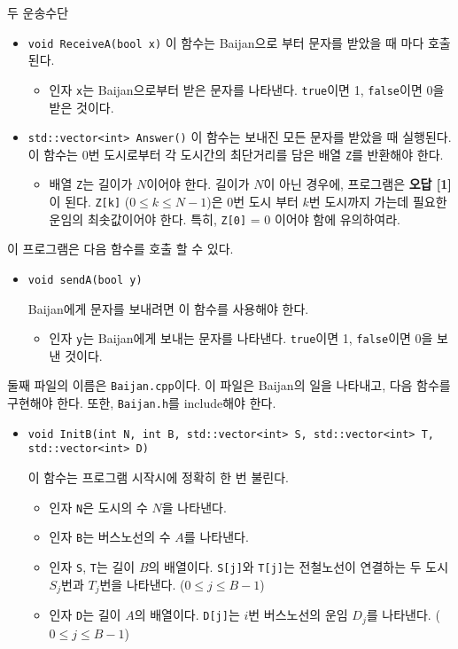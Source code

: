 \begin{problem}{두 운송수단}
\begin{itemize}
		\item \texttt{void ReceiveA(bool x)}
		이 함수는 Baijan으로 부터 문자를 받았을 때 마다 호출 된다.
		\begin{itemize}
			\item 인자 \texttt{x}는 Baijan으로부터 받은 문자를 나타낸다. \texttt{true}이면 1, \texttt{false}이면 0을 받은 것이다.
		\end{itemize}
		
		\item \texttt{std::vector<int> Answer()}
		이 함수는 보내진 모든 문자를 받았을 때 실행된다. 이 함수는 0번 도시로부터 각 도시간의 최단거리를 담은 배열 \texttt{Z}를 반환해야 한다.
		\begin{itemize}
			\item 배열 \texttt{Z}는 길이가 $N$이어야 한다. 길이가 $N$이 아닌 경우에, 프로그램은 \textbf{오답 [1]}이 된다.
			\texttt{Z[k]} ($0 \le k \le N-1$)은 0번 도시 부터 $k$번 도시까지 가는데 필요한 운임의 최솟값이어야 한다. 특히, \texttt{Z[0]} = 0 이어야 함에 유의하여라.
		\end{itemize}
	\end{itemize}

	이 프로그램은 다음 함수를 호출 할 수 있다.

	\begin{itemize}
		\item \texttt{void sendA(bool y)}
		
		Baijan에게 문자를 보내려면 이 함수를 사용해야 한다.
		
		\begin{itemize}
			\item 인자 \texttt{y}는 Baijan에게 보내는 문자를 나타낸다. \texttt{true}이면 1, \texttt{false}이면 0을 보낸 것이다.
		\end{itemize}
		
	\end{itemize}
		
	둘째 파일의 이름은 \texttt{Baijan.cpp}이다. 이 파일은 Baijan의 일을 나타내고, 다음 함수를 구현해야 한다. 또한, \texttt{Baijan.h}를 include해야 한다.

	\begin{itemize}
		\item \texttt{void InitB(int N, int B, std::vector<int> S, std::vector<int> T, std::vector<int> D)}
		
		이 함수는 프로그램 시작시에 정확히 한 번 불린다.
		\begin{itemize}
			\item 인자 \texttt{N}은 도시의 수 $N$을 나타낸다.
			\item 인자 \texttt{B}는 버스노선의 수 $A$를 나타낸다.
			\item 인자 \texttt{S}, \texttt{T}는 길이 $B$의 배열이다. \texttt{S[j]}와 \texttt{T[j]}는 전철노선이 연결하는 두 도시 $S_j$번과 $T_j$번을 나타낸다. ($0 \le j \le B-1$)
			\item 인자 \texttt{D}는 길이 $A$의 배열이다. \texttt{D[j]}는 $i$번 버스노선의 운임 $D_j$를 나타낸다. ($0 \le j \le B-1$)
		\end{itemize}
		

\end{itemize}
\end{problem}
